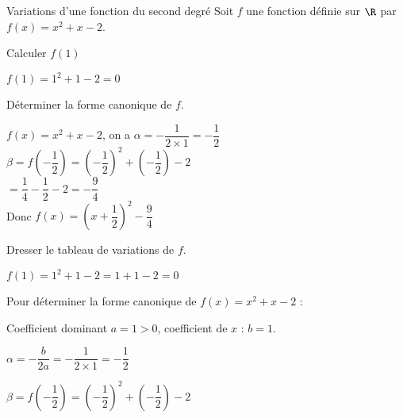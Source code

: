 \begin{EXO}{Variations d'une fonction du second degré}{}
Soit $f$ une fonction définie sur $\R$ par $f(x) = x^2+x-2$.

\begin{tcbenumerate}[3]
\tcbitem {} Calculer $f(1)$

\begin{crep}
$f(1) = 1^2 + 1 - 2 = 0$
\end{crep}

\tcbitem[raster multicolumn=2]  Déterminer la forme canonique de $f$.

\begin{crep}[extra lines=1]
$f(x) = x^2 + x - 2$, on a  $\alpha = -\dfrac{1}{2 \times 1} = -\dfrac{1}{2}$\\[0.6em]
$\beta = f\left(-\dfrac{1}{2}\right)= \left(-\dfrac{1}{2}\right)^2 + \left(-\dfrac{1}{2}\right) - 2 $\\[0.6em]
$= \dfrac{1}{4} - \dfrac{1}{2} - 2 = -\dfrac{9}{4}$\\[0.6em]
Donc $f(x) = \left(x + \dfrac{1}{2}\right)^2 - \dfrac{9}{4}$
\end{crep}

\tcbitem[raster multicolumn=3]  Dresser le tableau de variations de $f$.
\begin{crep}[colframe=white, colback=white]


\begin{center}
\end{center}
\end{crep}
\end{tcbenumerate}

\exocorrection

\begin{tcbenumerate}[3]
\tcbitem $f(1) = 1^2 + 1 - 2 = 1 + 1 - 2 = 0$

\tcbitem Pour déterminer la forme canonique de $f(x) = x^2 + x - 2$ :

Coefficient dominant $a = 1 > 0$, coefficient de $x$ : $b = 1$.

$\alpha = -\dfrac{b}{2a} = -\dfrac{1}{2 \times 1} = -\dfrac{1}{2}$

$\beta = f\left(-\dfrac{1}{2}\right) = \left(-\dfrac{1}{2}\right)^2 + \left(-\dfrac{1}{2}\right) - 2$


\end{tcbenumerate}
\end{EXO}
